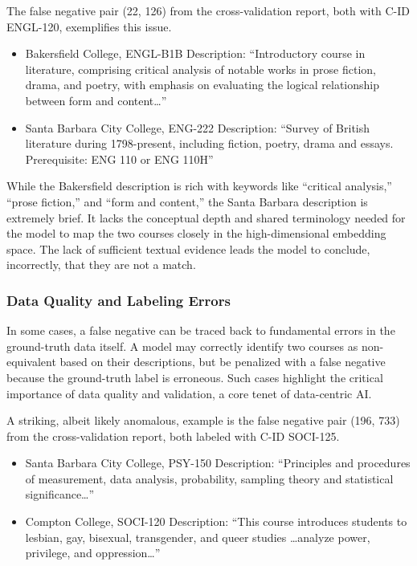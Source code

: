 The false negative pair (22, 126) from the cross-validation report, both with C-ID ENGL-120, exemplifies this issue.
\begin{itemize}
    \item Bakersfield College, ENGL-B1B Description: ``Introductory course in literature, comprising critical analysis of notable works in prose fiction, drama, and poetry, with emphasis on evaluating the logical relationship between form and content\dots''
    \item Santa Barbara City College, ENG-222 Description: ``Survey of British literature during 1798-present, including fiction, poetry, drama and essays. Prerequisite: ENG 110 or ENG 110H''
\end{itemize}
While the Bakersfield description is rich with keywords like ``critical analysis,'' ``prose fiction,'' and ``form and content,'' the Santa Barbara description is extremely brief. It lacks the conceptual depth and shared terminology needed for the model to map the two courses closely in the high-dimensional embedding space. The lack of sufficient textual evidence leads the model to conclude, incorrectly, that they are not a match.

\subsubsection{Data Quality and Labeling Errors}
In some cases, a false negative can be traced back to fundamental errors in the ground-truth data itself. A model may correctly identify two courses as non-equivalent based on their descriptions, but be penalized with a false negative because the ground-truth label is erroneous. Such cases highlight the critical importance of data quality and validation, a core tenet of data-centric AI.

A striking, albeit likely anomalous, example is the false negative pair (196, 733) from the cross-validation report, both labeled with C-ID SOCI-125.
\begin{itemize}
    \item Santa Barbara City College, PSY-150 Description: ``Principles and procedures of measurement, data analysis, probability, sampling theory and statistical significance\dots''
    \item Compton College, SOCI-120 Description: ``This course introduces students to lesbian, gay, bisexual, transgender, and queer studies \dots analyze power, privilege, and oppression\dots''
\end{itemize}

